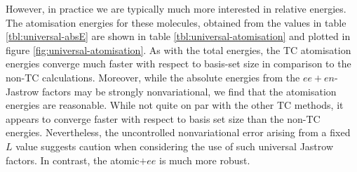 However, in practice we are typically much more interested in relative energies. The atomisation energies for these molecules, obtained from the values in table \ref{tbl:universal-absE} are shown in table \ref{tbl:universal-atomisation} and plotted in figure \ref{fig:universal-atomisation}. As with the total energies, the TC atomisation energies converge much faster with respect to basis-set size in comparison to the non-TC calculations. Moreover, while the absolute energies from the $ee+en$-Jastrow factors may be strongly nonvariational, we find that the atomisation energies are reasonable. While not quite on par with the other TC methods, it appears to converge faster with respect to basis set size than the non-TC energies. Nevertheless, the uncontrolled nonvariational error arising from a fixed $L$ value suggests caution when considering the use of such universal Jastrow factors. In contrast, the atomic$+ee$ is much more robust.


